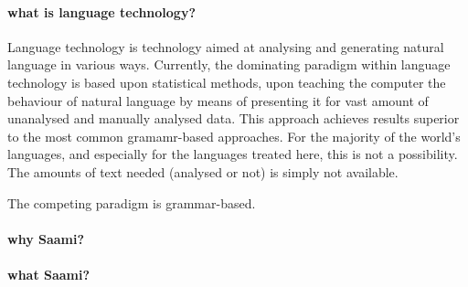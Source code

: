 \documentclass[a4paper,12pt]{article}
\begin{document}
\paragraph{what is language technology?}

Language technology is technology aimed at analysing and generating natural language in various ways. Currently, the dominating paradigm within language technology is based upon statistical methods, upon teaching the computer the behaviour of natural language by means of presenting it for vast amount of unanalysed and manually analysed data. This approach achieves results superior to the most common gramamr-based approaches. For the majority of the world's languages, and especially for the languages treated here, this is not a possibility. The amounts of text needed (analysed or not) is simply not available. 

The competing paradigm is grammar-based. 

\paragraph{why Saami?}

\paragraph{what Saami?}
\end{document}
